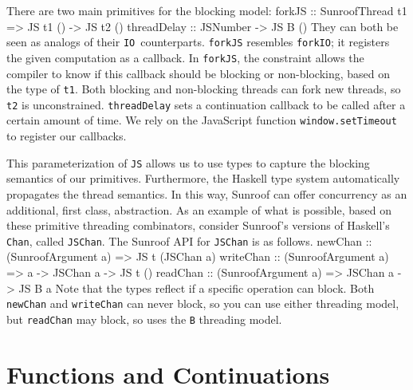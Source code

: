 \documentclass{llncs}
\newcommand{\Src}[1]{{\tt{#1}}}
\newcommand{\IO}{\Src{IO}}
\newenvironment{Code}{\verbatim}{\endverbatim}
\begin{document}
There are two main primitives for the blocking model:
\begin{Code}
forkJS      :: SunroofThread t1 => JS t1 () -> JS t2 ()
threadDelay :: JSNumber -> JS B ()
\end{Code}
They can both be seen as analogs of their \IO~counterparts.
\Src{forkJS} resembles \Src{forkIO};
it registers the given computation as a callback. 
In \Src{forkJS}, the\linebreak\Src{SunroofThread} constraint allows the compiler
to know if this callback should be blocking or non-blocking,
based on the type of \Src{t1}. Both blocking and non-blocking
threads can fork new threads, so \Src{t2} is unconstrained.
\Src{threadDelay} sets a continuation callback to be called after a certain amount of time.
We rely on the JavaScript function \Src{window.setTimeout} 
\cite{whatwg:timers} to register our callbacks.

This parameterization of \Src{JS} allows us to use types to capture
the blocking semantics of our primitives.
Furthermore, the Haskell type system automatically propagates
the thread semantics. In this way, Sunroof can offer concurrency
as an additional, first class, abstraction.
As an example of what is possible, based on these primitive
threading combinators, consider Sunroof's
versions of Haskell's \Src{Chan}, called \Src{JSChan}.
The Sunroof API for \Src{JSChan} is as follows.
\begin{Code}
newChan   :: (SunroofArgument a) => JS t (JSChan a)
writeChan :: (SunroofArgument a) => a -> JSChan a -> JS t ()
readChan  :: (SunroofArgument a) => JSChan a -> JS B a
\end{Code}
Note that the types reflect if a specific operation can block.
Both \Src{newChan} and \Src{writeChan} can never block, so you can use either threading model,
but \Src{readChan} may block, so uses the \Src{B} threading model.


\section{Functions and Continuations}
\label{sec:functions-continuations}
\end{document}
